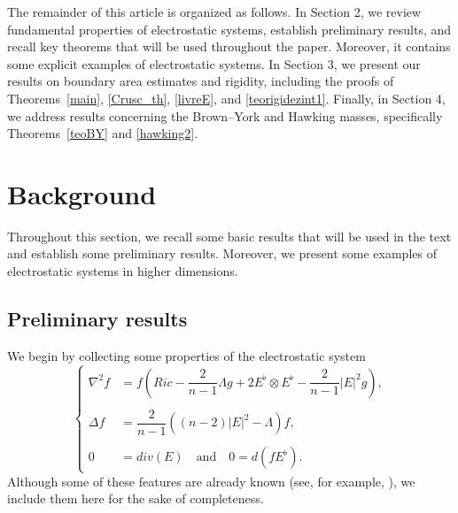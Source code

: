 \documentclass{amsart}
\numberwithin{equation}{section}
\begin{document}
\vspace{0.30cm}

The remainder of this article is organized as follows. In Section 2, we review fundamental properties of electrostatic systems, establish preliminary results, and recall key theorems that will be used throughout the paper. Moreover, it contains some explicit examples of electrostatic systems. In Section 3, we present our results on boundary area estimates and rigidity, including the proofs of Theorems~\ref{main}, \ref{Crusc_th}, \ref{livreE}, and \ref{teorigidezint1}. Finally, in Section 4, we address results concerning the Brown–York and Hawking masses, specifically Theorems~\ref{teoBY} and \ref{hawking2}.




	\section{Background}
	\label{Sec2}
	
	Throughout this section, we recall some basic results that will be used in the text and establish some preliminary results. Moreover, we present some examples of electrostatic systems in higher dimensions. 

	\subsection{Preliminary results} We begin by collecting some properties of the electrostatic system 
\begin{equation}\label{s1}
\left\{
\begin{aligned}
\nabla^2 f &= f \left( Ric - \dfrac{2}{n-1} \Lambda g + 2 E^\flat \otimes E^\flat - \dfrac{2}{n-1} |E|^2 g \right), \\\\
\Delta f &= \dfrac{2}{n-1} \left( (n-2)|E|^2 - \Lambda \right) f, \\\\
0 &= div(E) \quad \text{and} \quad 0 = d(f E^\flat).
\end{aligned}
\right.
\end{equation} Although some of these features are already known (see, for example, \cite[Lemma 4]{tiarlos}), we include them here for the sake of completeness.
\end{document}
